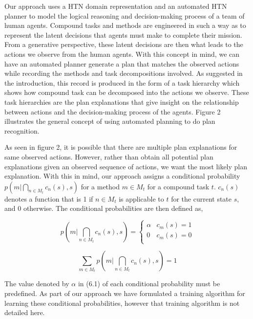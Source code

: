 Our approach uses a HTN domain representation and an automated HTN planner to model the logical reasoning and decision-making process of a team of human agents. Compound tasks and methods are engineered in such a way as to represent the latent decisions that agents must make to complete their mission. From a generative perspective, these latent decisions are then what leads to the actions we observe from the human agents. With this concept in mind, we can have an automated planner generate a plan that matches the observed actions while recording the methods and task decompositions involved. As suggested in the introduction, this record is produced in the form of a task hierarchy which shows how compound task can be decomposed into the actions we observe. These task hierarchies are the plan explanations that give insight on the relationship between actions and the decision-making process of the agents. Figure 2 illustrates the general concept of using automated planning to do plan recognition.

As seen in figure 2, it is possible that there are multiple plan explanations for same observed actions. However, rather than obtain all potential plan explanations given an observed sequence of actions, we want the most likely plan explanation. With this in mind, our approach assigns a conditional probability $p(m | \bigcap_{n \in M_t} c_n(s), s)$ for a method $m \in M_t$ for a compound task $t$. $c_n(s)$ denotes a function that is 1 if $n \in M_t$ is applicable to $t$ for the current state $s$, and 0 otherwise. The conditional probabilities are then defined as,

\begin{equation}
p(m | \bigcap_{n \in M_t} c_n(s), s) = \begin{cases} \alpha  & c_m(s) = 1 \\ 0 & c_m(s) = 0 \\ \end{cases}
\end{equation}

\begin{equation}
\sum_{m \in M_t} p(m | \bigcap_{n \in M_t} c_n(s), s) = 1
\end{equation}

The value denoted by $\alpha$ in (6.1) of each conditional probability must be predefined. As part of our approach we have formulated a training algorithm for learning these conditional probabilities, however that training algorithm is not detailed here. 

